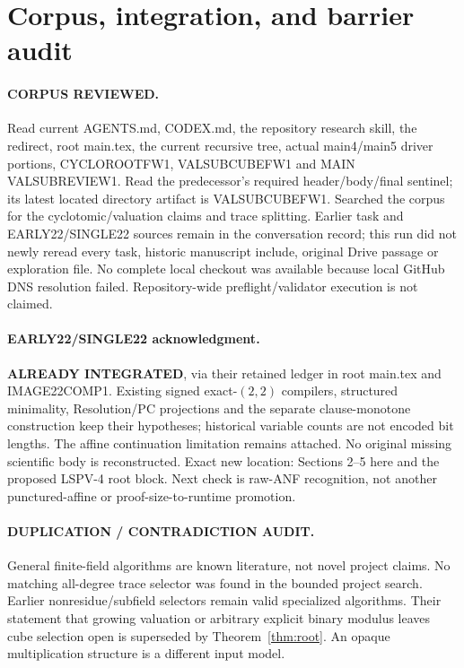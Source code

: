 \documentclass[11pt]{article}
\begin{document}
\section{Corpus, integration, and barrier audit}
\paragraph{CORPUS REVIEWED.}
Read current AGENTS.md, CODEX.md, the repository research skill, the redirect,
root main.tex, the current recursive tree, actual main4/main5 driver portions,
CYCLOROOTFW1, VALSUBCUBEFW1 and MAIN VALSUBREVIEW1. Read the predecessor's
required header/body/final sentinel; its latest located directory artifact
is VALSUBCUBEFW1. Searched the corpus for the cyclotomic/valuation claims and
trace splitting. Earlier task and EARLY22/SINGLE22 sources remain in the
conversation record; this run did not newly reread every task, historic
manuscript include, original Drive passage or exploration file. No complete
local checkout was available because local GitHub DNS resolution failed.
Repository-wide preflight/validator execution is not claimed.

\paragraph{EARLY22/SINGLE22 acknowledgment.}
\textbf{ALREADY INTEGRATED}, via their retained ledger in root main.tex and
IMAGE22COMP1. Existing signed exact-$(2,2)$ compilers, structured minimality,
Resolution/PC projections and the separate clause-monotone construction keep
their hypotheses; historical variable counts are not encoded bit lengths.
The affine continuation limitation remains attached. No original missing
scientific body is reconstructed. Exact new location: Sections 2--5 here and
the proposed LSPV-4 root block. Next check is raw-ANF recognition, not another
punctured-affine or proof-size-to-runtime promotion.

\paragraph{DUPLICATION / CONTRADICTION AUDIT.}
General finite-field algorithms are known literature, not novel project
claims. No matching all-degree trace selector was found in the bounded
project search. Earlier nonresidue/subfield selectors remain valid specialized
algorithms. Their statement that growing valuation or arbitrary explicit
binary modulus leaves cube selection open is superseded by Theorem~\ref{thm:root}.
An opaque multiplication structure is a different input model.
\end{document}
